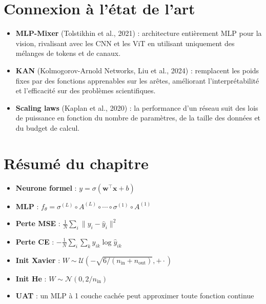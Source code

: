 \section{Connexion \`a l'\'etat de l'art}
\label{sec:sota_mlp}

\begin{sota}
\begin{itemize}
\item \textbf{MLP-Mixer} (Tolstikhin et al., 2021) : architecture enti\`erement MLP pour la vision, rivalisant avec les CNN et les ViT en utilisant uniquement des m\'elanges de tokens et de canaux.
\item \textbf{KAN} (Kolmogorov-Arnold Networks, Liu et al., 2024) : remplacent les poids fixes par des fonctions apprenables sur les ar\^etes, am\'eliorant l'interpr\'etabilit\'e et l'efficacit\'e sur des probl\`emes scientifiques.
\item \textbf{Scaling laws} (Kaplan et al., 2020) : la performance d'un r\'eseau suit des lois de puissance en fonction du nombre de param\`etres, de la taille des donn\'ees et du budget de calcul.
\end{itemize}
\end{sota}

\section{R\'esum\'e du chapitre}

\begin{formules}
\begin{itemize}
\item \textbf{Neurone formel} : $y = \sigma(\bm{w}^\top \bm{x} + b)$
\item \textbf{MLP} : $f_\theta = \sigma^{(L)} \circ A^{(L)} \circ \cdots \circ \sigma^{(1)} \circ A^{(1)}$
\item \textbf{Perte MSE} : $\frac{1}{N}\sum_i \|y_i - \hat{y}_i\|^2$
\item \textbf{Perte CE} : $-\frac{1}{N}\sum_i \sum_k y_{ik}\log\hat{y}_{ik}$
\item \textbf{Init Xavier} : $W \sim \mathcal{U}(-\sqrt{6/(n_{\mathrm{in}}+n_{\mathrm{out}})}, +\cdot)$
\item \textbf{Init He} : $W \sim \mathcal{N}(0, 2/n_{\mathrm{in}})$
\item \textbf{UAT} : un MLP \`a 1 couche cach\'ee peut approximer toute fonction continue
\end{itemize}
\end{formules}

